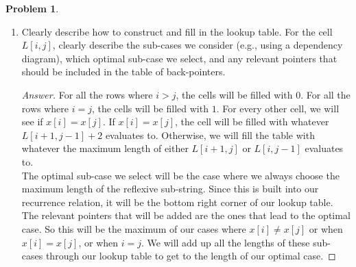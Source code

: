 \documentclass[11pt]{article}
\theoremstyle{definition}
\theoremstyle{definition}
\newtheorem{required}{Problem}
\theoremstyle{definition}
\begin{document}
\begin{required}
\begin{enumerate}[label=(\alph*)]
\begin{proof}[Answer]
When $i > j$, we have an empty substring, so length of 0.\\
When $i = j$, we have a substring of length 1.\\
When $x[i] = x[j]$, we have a reflexive substring, so we add 2 to our length and continue our recursion inwards.\\
When  $x[i] \ne x[j]$ we want to choose the recursion inwards that changes either $i$ or $j$ that provides us with the maximum length substring we are looking for, hence the $max$ function application.\\

\end{proof}



\newpage
        \subsection{Problem 25\ref{2b} (2 Points)}
\item \label{2b} Clearly describe how to construct and fill in the lookup table. For the cell $L[i, j]$, clearly describe the sub-cases we consider (e.g., using a dependency diagram), which optimal sub-case we select, and any relevant pointers that should be included in the table of back-pointers.

\begin{proof}[Answer]
For all the rows where $i > j$, the cells will be filled with $0$. For all the rows where $i = j$, the cells will be filled with $1$. For every other cell, we will see if $x[i] = x[j]$. If $x[i] = x[j]$, the cell will be filled with whatever $L[i + 1, j - 1] + 2$ evaluates to. Otherwise, we will fill the table with whatever the maximum length of either $L[i + 1, j]$ or $L[i, j - 1]$ evaluates to.\\

The optimal sub-case we select will be the case where we always choose the maximum length of the reflexive sub-string. Since this is built into our recurrence relation, it will be the bottom right corner of our lookup table.\\

The relevant pointers that will be added are the ones that lead to the optimal case. So this will be the maximum of our cases where $x[i] \ne x[j]$ or when $x[i] = x[j]$, or when $i = j$. We will add up all the lengths of these sub-cases through our lookup table to get to the length of our optimal case.
\end{proof}




\end{enumerate}
\end{required}
\end{document}
